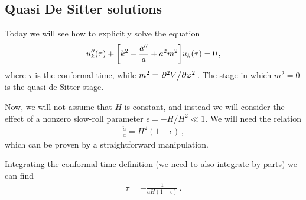 \documentclass[main.tex]{subfiles}
\begin{document}
\subsection{Quasi De Sitter solutions}


Today we will see how to explicitly solve the equation 
%
\begin{align}
u''_k (\tau )
+ 
\qty[k^2 - \frac{a''}{a} + a^2 m^2] u_k (\tau ) = 0
\,,
\end{align}
%
where \(\tau \) is the conformal time, while \(m^2 = \pdv*[2]{V}{\varphi }\). 
The stage in which \(m^2 = 0\) is the quasi de-Sitter stage. 

Now, we will not assume that \(H\) is constant, and instead we will consider the effect of a nonzero slow-roll parameter \(\epsilon = - \dot{H} / H^2 \ll 1\). 
We will need the relation
%
\begin{align}
\frac{\ddot{a}}{a} = H^2 ( 1- \epsilon )
\,,
\end{align}
%
which can be proven by a straightforward manipulation.

\begin{claim}

Integrating the conformal time definition (we need to also integrate by parts) we can find 
%
\begin{align}
\tau = - \frac{1}{a H (1 - \epsilon )}
\,.
\end{align}
\end{claim}
\end{document}
